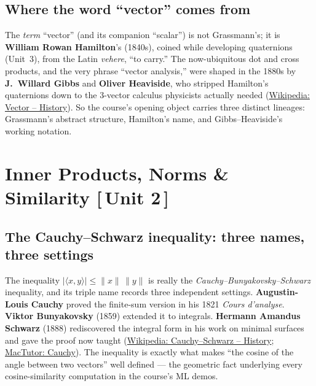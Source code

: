 \documentclass[11pt]{article}
\newcommand{\who}[1]{{\sffamily\bfseries #1}}
\newcommand{\yr}[1]{{\sffamily\color{BrickRed}(#1)}}
\newcommand{\unit}[1]{{\footnotesize\sffamily\color{RoyalBlue}[\,#1\,]}}
\begin{document}
\subsection{Where the word ``vector'' comes from}
The \emph{term} ``vector'' (and its companion ``scalar'') is not Grassmann's; it
is \who{William Rowan Hamilton}'s \yr{1840s}, coined while developing quaternions
(Unit~3), from the Latin \emph{vehere}, ``to carry.'' The now-ubiquitous dot and
cross products, and the very phrase ``vector analysis,'' were shaped in the 1880s
by \who{J.\ Willard Gibbs} and \who{Oliver Heaviside}, who stripped Hamilton's
quaternions down to the 3-vector calculus physicists actually needed
(\href{https://en.wikipedia.org/wiki/Vector_(mathematics_and_physics)\#History}{Wikipedia:
Vector -- History}). So the course's opening object carries three distinct
lineages: Grassmann's abstract structure, Hamilton's name, and Gibbs--Heaviside's
working notation.

\section{Inner Products, Norms \& Similarity \unit{Unit 2}}

\subsection{The Cauchy--Schwarz inequality: three names, three settings}
The inequality $|\langle x,y\rangle|\le\|x\|\,\|y\|$ is really the
\emph{Cauchy--Bunyakovsky--Schwarz} inequality, and its triple name records three
independent settings. \who{Augustin-Louis Cauchy} proved the finite-sum version in
his 1821 \emph{Cours d'analyse}. \who{Viktor Bunyakovsky} \yr{1859} extended it to
integrals. \who{Hermann Amandus Schwarz} \yr{1888} rediscovered the integral form
in his work on minimal surfaces and gave the proof now taught
(\href{https://en.wikipedia.org/wiki/Cauchy\%E2\%80\%93Schwarz_inequality\#History}{Wikipedia:
Cauchy--Schwarz -- History};
\href{https://mathshistory.st-andrews.ac.uk/Biographies/Cauchy/}{MacTutor:
Cauchy}). The inequality is exactly what makes ``the cosine of the angle between
two vectors'' well defined --- the geometric fact underlying every cosine-similarity
computation in the course's ML demos.
\end{document}
